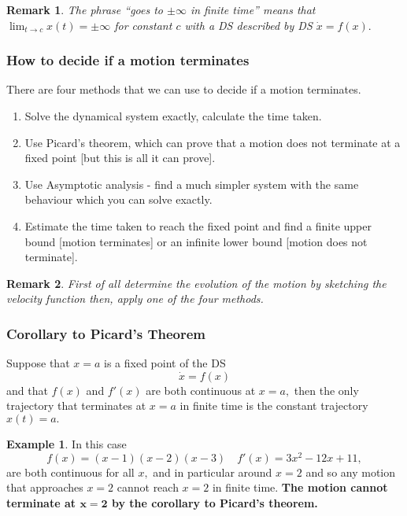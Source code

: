 \documentclass[12pt, a4paper]{article}
\newtheorem*{remark}{Remark}
\theoremstyle{definition}
\newtheorem*{example}{Example}
\theoremstyle{plain}
\begin{document}
\begin{remark}
The phrase ``goes to $\pm\infty$ in finite time'' means that $\lim_{t \to c} x(t) =\pm\infty$ for constant $c$ with a DS described by  DS $\dot{x}=f(x).$
\end{remark}

\subsubsection*{How to decide if a motion terminates}

There are four methods that we can use to decide if a motion terminates. 
\begin{enumerate}
	
	\item Solve the dynamical system exactly, calculate the time taken.
	\item Use Picard’s theorem, which can prove that a motion does not terminate at a fixed point [but this is all it can prove].
	\item Use Asymptotic analysis - find a much simpler system with the same behaviour which you can solve exactly.
	\item Estimate the time taken to reach the fixed point and find a finite upper bound [motion terminates] or an infinite lower bound [motion does not terminate].

\end{enumerate}

\begin{remark}
First of all determine the evolution of the motion by sketching the velocity function then, apply one of the four methods.
\end{remark}

\subsubsection{Corollary to Picard's Theorem}

Suppose that $x = a$ is a fixed point of the DS $$\dot{x}=f(x)$$ and that $f(x)$ and $f'(x)$ are both continuous at $x = a,$ then the only trajectory that terminates at $x = a$ in finite time is the constant trajectory $x(t) = a.$

\begin{example}
In this case $$f(x)=(x-1)(x-2)(x-3) \quad f'(x)=3x^2-12x+11,$$ are both continuous for all $x,$ and in particular around $x = 2$ and so any motion that approaches $x = 2$ cannot reach $x = 2$ in finite time. \textbf{The motion cannot terminate at $\mathbf{x = 2}$ by the corollary to Picard’s theorem.} 
\end{example}
\end{document}
